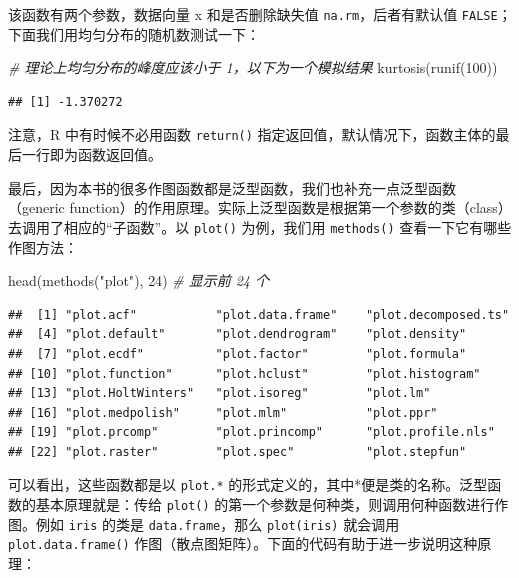 \documentclass[
  b5paper,
  UTF8,twoside]{book}
\newenvironment{Shaded}{\begin{snugshade}}{\end{snugshade}}
\newcommand{\CommentTok}[1]{\textcolor[rgb]{0.56,0.35,0.01}{\textit{#1}}}
\newcommand{\DecValTok}[1]{\textcolor[rgb]{0.00,0.00,0.81}{#1}}
\newcommand{\FunctionTok}[1]{\textcolor[rgb]{0.00,0.00,0.00}{#1}}
\newcommand{\NormalTok}[1]{#1}
\newcommand{\StringTok}[1]{\textcolor[rgb]{0.31,0.60,0.02}{#1}}
\begin{document}
该函数有两个参数，数据向量 x 和是否删除缺失值 \texttt{na.rm}，后者有默认值 \texttt{FALSE}；下面我们用均匀分布的随机数测试一下：

\begin{Shaded}
\begin{Highlighting}[]
\CommentTok{\# 理论上均匀分布的峰度应该小于 1，以下为一个模拟结果}
\FunctionTok{kurtosis}\NormalTok{(}\FunctionTok{runif}\NormalTok{(}\DecValTok{100}\NormalTok{))}
\end{Highlighting}
\end{Shaded}

\begin{verbatim}
## [1] -1.370272
\end{verbatim}

注意，R 中有时候不必用函数 \texttt{return()} 指定返回值，默认情况下，函数主体的最后一行即为函数返回值。

最后，因为本书的很多作图函数都是泛型函数，我们也补充一点泛型函数 （generic function）的作用原理。实际上泛型函数是根据第一个参数的类（class）去调用了相应的``子函数''。以 \texttt{plot()} 为例，我们用 \texttt{methods()} 查看一下它有哪些作图方法：

\begin{Shaded}
\begin{Highlighting}[]
\FunctionTok{head}\NormalTok{(}\FunctionTok{methods}\NormalTok{(}\StringTok{"plot"}\NormalTok{), }\DecValTok{24}\NormalTok{) }\CommentTok{\# 显示前 24 个}
\end{Highlighting}
\end{Shaded}

\begin{verbatim}
##  [1] "plot.acf"           "plot.data.frame"    "plot.decomposed.ts"
##  [4] "plot.default"       "plot.dendrogram"    "plot.density"      
##  [7] "plot.ecdf"          "plot.factor"        "plot.formula"      
## [10] "plot.function"      "plot.hclust"        "plot.histogram"    
## [13] "plot.HoltWinters"   "plot.isoreg"        "plot.lm"           
## [16] "plot.medpolish"     "plot.mlm"           "plot.ppr"          
## [19] "plot.prcomp"        "plot.princomp"      "plot.profile.nls"  
## [22] "plot.raster"        "plot.spec"          "plot.stepfun"
\end{verbatim}

可以看出，这些函数都是以 \texttt{plot.*} 的形式定义的，其中*便是类的名称。泛型函数的基本原理就是：传给 \texttt{plot()} 的第一个参数是何种类，则调用何种函数进行作图。例如 \texttt{iris} 的类是 \texttt{data.frame}，那么 \texttt{plot(iris)} 就会调用 \texttt{plot.data.frame()} 作图（散点图矩阵）。下面的代码有助于进一步说明这种原理：
\end{document}
